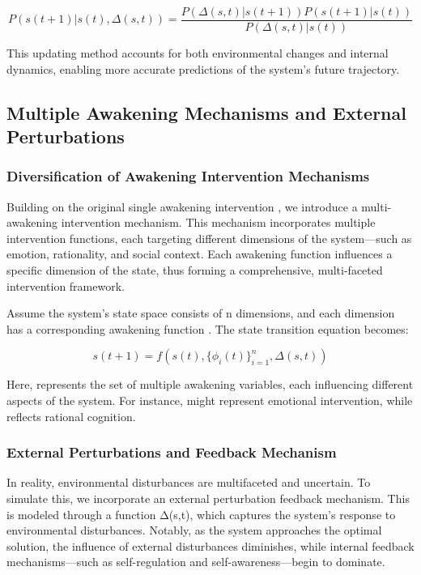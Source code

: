 \documentclass{article}
\begin{document}
\[ P(s(t+1) | s(t), \Delta(s,t)) = \frac{P(\Delta(s,t) | s(t+1)) P(s(t+1) | s(t))}{P(\Delta(s,t) | s(t))} \]

This updating method accounts for both environmental changes and internal dynamics, enabling more accurate predictions of the system’s future trajectory.

\subsection{Multiple Awakening Mechanisms and External Perturbations}

\subsubsection{Diversification of Awakening Intervention Mechanisms}

Building on the original single awakening intervention , we introduce a multi-awakening intervention mechanism. This mechanism incorporates multiple intervention functions, each targeting different dimensions of the system—such as emotion, rationality, and social context. Each awakening function  influences a specific dimension of the state, thus forming a comprehensive, multi-faceted intervention framework.

Assume the system’s state space consists of n dimensions, and each dimension has a corresponding awakening function . The state transition equation becomes: 

\[ s(t+1) = f(s(t), \{\phi_i(t)\}_{i=1}^n, \Delta(s,t)) \]

Here, {} represents the set of multiple awakening variables, each influencing different aspects of the system. For instance, might represent emotional intervention, while  reflects rational cognition.

\subsubsection{External Perturbations and Feedback Mechanism}

In reality, environmental disturbances are multifaceted and uncertain. To simulate this, we incorporate an external perturbation feedback mechanism. This is modeled through a function Δ(s,t), which captures the system’s response to environmental disturbances. Notably, as the system approaches the optimal solution, the influence of external disturbances diminishes, while internal feedback mechanisms—such as self-regulation and self-awareness—begin to dominate.
\end{document}
